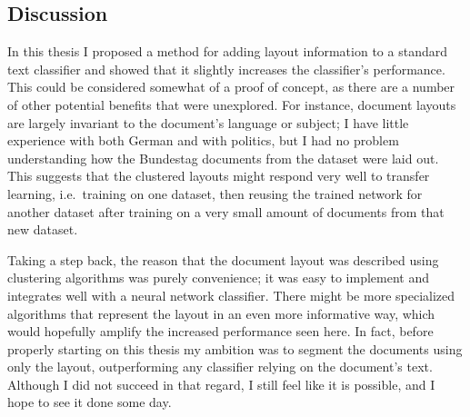 \subsection{Discussion}
In this thesis I proposed a method for adding layout information to a standard text
classifier and showed that it slightly increases the classifier's performance.
This could be considered somewhat of a proof of concept, as there are a number
of other potential benefits that were unexplored. For instance, document layouts
are largely invariant to the document's language or subject; I have little
experience with both German and with politics, but I had no problem
understanding how the Bundestag documents from the dataset were laid out. This
suggests that the clustered layouts might respond very well to transfer
learning, i.e.\ training on one dataset, then reusing the trained network for
another dataset after training on a very small amount of documents from that new
dataset.

Taking a step back, the reason that the document layout was described using
clustering algorithms was purely convenience; it was easy to implement and
integrates well with a neural network classifier. There might be more
specialized algorithms that represent the layout in an even more informative
way, which would hopefully amplify the increased performance seen here. In fact,
before properly starting on this thesis my ambition was to segment the documents
using only the layout, outperforming any classifier relying on the document's
text. Although I did not succeed in that regard, I still feel like it is
possible, and I hope to see it done some day.

